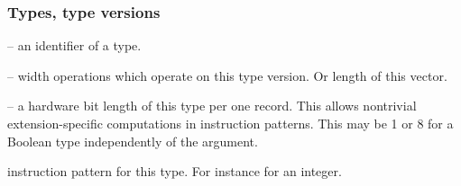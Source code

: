 \subsubsection{Types, type versions}
\begin{description}
        \item{} -- an identifier of a type.
        \item{} -- width operations which operate on this type version. Or length of this vector.
        \item{} -- a hardware bit length of this type per one record. This allows nontrivial extension-specific computations in instruction patterns. This may be 1 or 8 for a Boolean type independently of the  argument.
        \item{} instruction pattern for this type. For instance  for an integer.
\end{description}


